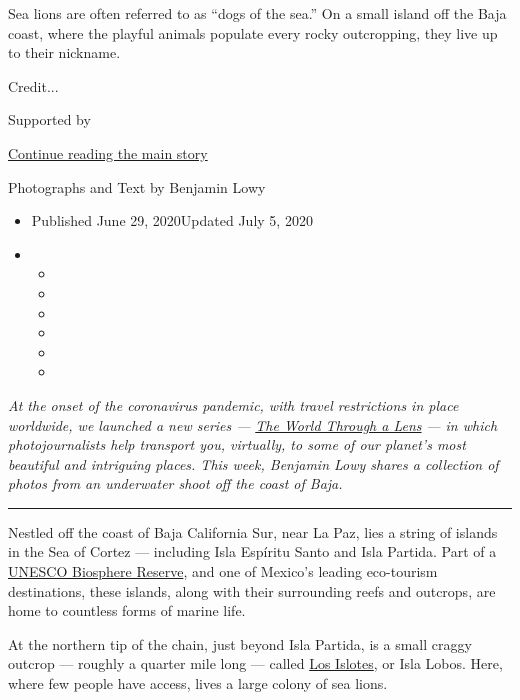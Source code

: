 Sea lions are often referred to as ``dogs of the sea.'' On a small
island off the Baja coast, where the playful animals populate every
rocky outcropping, they live up to their nickname.

Credit...

Supported by

\protect\hyperlink{after-sponsor}{Continue reading the main story}

Photographs and Text by Benjamin Lowy

\begin{itemize}
\item
  Published June 29, 2020Updated July 5, 2020
\item
  \begin{itemize}
  \item
  \item
  \item
  \item
  \item
  \item
  \end{itemize}
\end{itemize}

\emph{At the onset of the coronavirus pandemic, with travel restrictions
in place worldwide, we launched a new series ---}
\href{https://www.nytimes.com/column/the-world-through-a-lens}{\emph{The
World Through a Lens}} \emph{--- in which photojournalists help
transport you, virtually, to some of our planet's most beautiful and
intriguing places. This week, Benjamin Lowy shares a collection of
photos from an underwater shoot off the coast of Baja.}

\begin{center}\rule{0.5\linewidth}{\linethickness}\end{center}

Nestled off the coast of Baja California Sur, near La Paz, lies a string
of islands in the Sea of Cortez --- including Isla Espíritu Santo and
Isla Partida. Part of a
\href{http://www.unesco.org/new/en/natural-sciences/environment/ecological-sciences/biosphere-reserves/latin-america-and-the-caribbean/mexico/islas-del-golfo-de-california/}{UNESCO
Biosphere Reserve}, and one of Mexico's leading eco-tourism
destinations, these islands, along with their surrounding reefs and
outcrops, are home to countless forms of marine life.

At the northern tip of the chain, just beyond Isla Partida, is a small
craggy outcrop --- roughly a quarter mile long --- called
\href{https://goo.gl/maps/Fb7rYDoTs2rKT8sw6}{Los Islotes}, or Isla
Lobos. Here, where few people have access, lives a large colony of sea
lions.

